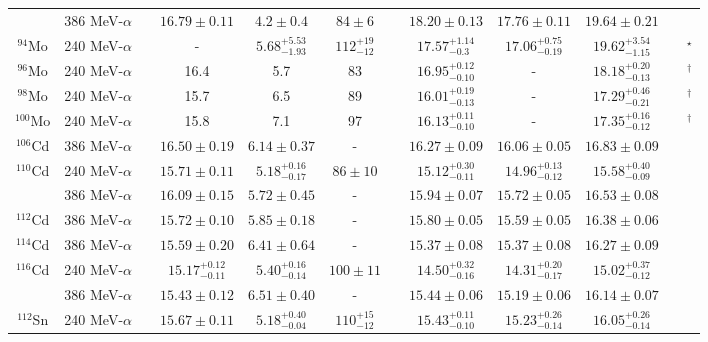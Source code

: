 \begin{table}[t!]
{\begin{tabular}{@{}cccccccccc@{}cc}
  & 386 MeV-$\alpha$ & & $16.79\pm0.11$ & $4.2\pm0.4$ & $84\pm6$ & & $18.20\pm0.13$ & $17.76\pm0.11$ & $19.64\pm0.21$ & & \cite{YKGPLB2016} \\
$^{94}$Mo & 240 MeV-$\alpha$ & & - & ${5.68}^{+5.53}_{-1.93}$ & ${112}^{+19}_{-12}$ & &  ${17.57}^{+1.14}_{-0.3}$ & ${17.06}^{+0.75}_{-0.19}$ & ${19.62}^{+3.54}_{-1.15}$ & & \cite{Button2016}$^\star$ \\
$^{96}$Mo & 240 MeV-$\alpha$ & & 16.4 & 5.7 & 83 & & ${16.95}^{+0.12}_{-0.10}$ & - & ${18.18}^{+0.20}_{-0.13}$ & & \cite{Button2016}$^\dagger$ \\
$^{98}$Mo & 240 MeV-$\alpha$ & & 15.7 & 6.5 & 89 & & ${16.01}^{+0.19}_{-0.13}$ & - & ${17.29}^{+0.46}_{-0.21}$ & & \cite{Button2016}$^\dagger$ \\
$^{100}$Mo & 240 MeV-$\alpha$ & & 15.8 & 7.1 & 97 & & ${16.13}^{+0.11}_{-0.10}$ & - & ${17.35}^{+0.16}_{-0.12}$ & & \cite{Button2016}$^\dagger$ \\
$^{106}$Cd & 386 MeV-$\alpha$ & & $16.50\pm0.19$ & $6.14\pm0.37$ & - & & $16.27\pm 0.09$ & $16.06\pm0.05$ & $16.83\pm0.09$ & & \cite{Darshana2012} \\
$^{110}$Cd & 240 MeV-$\alpha$ & & $15.71\pm0.11$ & ${5.18}^{+0.16}_{-0.17}$ & $86\pm10$ & & ${15.12}^{+0.30}_{-0.11}$ & ${14.96}^{+0.13}_{-0.12}$ & ${15.58}^{+0.40}_{-0.09}$ & & \cite{DHY2004_Cd} \\
  & 386 MeV-$\alpha$ & & $16.09\pm0.15$ & $5.72\pm0.45$ & - & & $15.94\pm0.07$ & $15.72\pm0.05$ & $16.53\pm0.08$ & & \cite{Darshana2012} \\
$^{112}$Cd & 386 MeV-$\alpha$ & & $15.72\pm0.10$ & $5.85\pm0.18$ & - & & $15.80\pm0.05$ & $15.59\pm0.05$ & $16.38\pm0.06$ & & \cite{Darshana2012} \\
$^{114}$Cd & 386 MeV-$\alpha$ & & $15.59\pm0.20$ & $6.41\pm0.64$ & - & & $15.37\pm0.08$ & $15.37\pm0.08$ & $16.27\pm0.09$ & & \cite{Darshana2012} \\
$^{116}$Cd & 240 MeV-$\alpha$ & & ${15.17}^{+0.12}_{-0.11}$ & ${5.40}^{+0.16}_{-0.14}$ & $100\pm11$ && ${14.50}^{+0.32}_{-0.16}$ & ${14.31}^{+0.20}_{-0.17}$ & ${15.02}^{+0.37}_{-0.12}$ & & \cite{DHY2004_Cd} \\
  & 386 MeV-$\alpha$ && $15.43\pm0.12$ & $6.51\pm0.40$ & - & & $15.44\pm0.06$ & $15.19\pm0.06$ & $16.14\pm0.07$ & & \cite{Darshana2012} \\
$^{112}$Sn & 240 MeV-$\alpha$ & & $15.67 \pm 0.11$ & ${5.18}^{+0.40}_{-0.04}$ & ${110}^{+15}_{-12}$ & & ${15.43}^{+0.11}_{-0.10}$ & ${15.23}^{+0.26}_{-0.14}$ & ${16.05}^{+0.26}_{-0.14}$ & & \cite{DHY2004_Sn} \\

\end{tabular}}
\end{table}
